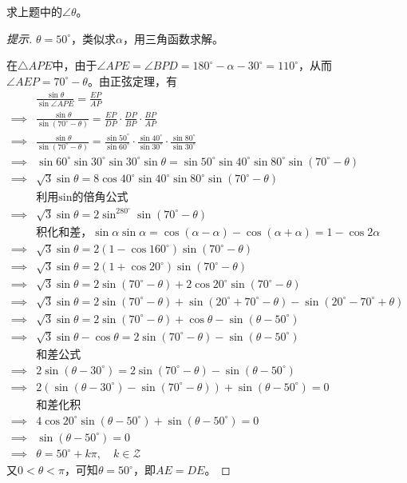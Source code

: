 \begin{example}
  求上题中的$\angle\theta$。
\end{example}
\begin{proof}[提示]
  $\theta=50^\circ$，类似求$\alpha$，用三角函数求解。

  在$\triangle APE$中，由于$\angle APE = \angle BPD = 180^\circ - \alpha - 30^\circ = 110^\circ$，从而$\angle AEP = 70^\circ - \theta$。由正弦定理，有
  \begin{align*}
    &\frac{\sin\theta}{\sin\angle APE} = \frac{EP}{AP}\\[3pt]
    \implies&
        \frac{\sin\theta}{\sin(70^\circ -\theta)} =
        \frac{EP}{DP} \cdot \frac{DP}{BP} \cdot \frac{BP}{AP}\\
    \implies &
        \frac{\sin\theta}{\sin(70^\circ -\theta)} =
        \frac{\sin50^\circ}{\sin60^\circ} \cdot \frac{\sin40^\circ}{\sin30^\circ} \cdot \frac{\sin80^\circ}{\sin30^\circ}\\
    \implies &
        \sin60^\circ \sin30^\circ \sin30^\circ \sin\theta = \sin50^\circ\sin40^\circ\sin80^\circ\sin(70^\circ-\theta)\\
    \implies &
        \sqrt3\sin\theta = 8\cos40^\circ\sin40^\circ\sin80^\circ\sin(70^\circ-\theta)\\
    &\text{利用$\sin$的倍角公式}\\
    \implies & \sqrt3\sin\theta = 2\sin^280^\circ\sin(70^\circ-\theta)\\
    &\text{积化和差，} \sin\alpha\sin\alpha = \cos(\alpha-\alpha)-\cos(\alpha+\alpha) = 1-\cos2\alpha\\
    \implies & \sqrt3\sin\theta = 2(1-\cos160^\circ)\sin(70^\circ-\theta)\\
    \implies & \sqrt3\sin\theta = 2(1+\cos20^\circ)\sin(70^\circ-\theta)\\
    \implies & \sqrt3\sin\theta = 2\sin(70^\circ-\theta)+2\cos20^\circ\sin(70^\circ-\theta)\\
    \implies & \sqrt3\sin\theta = 2\sin(70^\circ-\theta)+\sin(20^\circ+70^\circ-\theta)-\sin(20^\circ-70^\circ+\theta)\\
    \implies & \sqrt3\sin\theta = 2\sin(70^\circ-\theta)+\cos\theta-\sin(\theta-50^\circ)\\
    \implies & \sqrt3\sin\theta -\cos\theta  = 2\sin(70^\circ-\theta)-\sin(\theta-50^\circ)\\
    &\text{和差公式}\\
    \implies & 2\sin(\theta-30^\circ) = 2\sin(70^\circ-\theta)-\sin(\theta-50^\circ)\\
    \implies & 2\left(\sin(\theta-30^\circ) -\sin(70^\circ-\theta)\right) + \sin(\theta-50^\circ) = 0\\
    &\text{和差化积}\\
    \implies & 4\cos20^\circ\sin(\theta-50^\circ) + \sin(\theta-50^\circ) = 0 \\
    \implies & \sin(\theta-50^\circ) = 0\\
    \implies & \theta = 50^\circ + k\pi,\quad k\in\mathcal{Z}
  \end{align*}
  又$0<\theta<\pi$，可知$\theta = 50^\circ$，即$AE=DE$。
\end{proof}